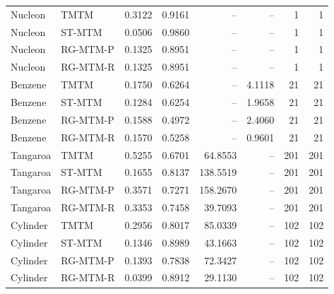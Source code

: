 \begin{longtable}{llrrrrrr}
Nucleon & TMTM & 0.3122 & 0.9161 & -- & -- & 1 & 1\\
Nucleon & ST-MTM & 0.0506 & 0.9860 & -- & -- & 1 & 1\\
Nucleon & RG-MTM-P & 0.1325 & 0.8951 & -- & -- & 1 & 1\\
Nucleon & RG-MTM-R & 0.1325 & 0.8951 & -- & -- & 1 & 1\\
Benzene & TMTM & 0.1750 & 0.6264 & -- & 4.1118 & 21 & 21\\
Benzene & ST-MTM & 0.1284 & 0.6254 & -- & 1.9658 & 21 & 21\\
Benzene & RG-MTM-P & 0.1588 & 0.4972 & -- & 2.4060 & 21 & 21\\
Benzene & RG-MTM-R & 0.1570 & 0.5258 & -- & 0.9601 & 21 & 21\\
Tangaroa & TMTM & 0.5255 & 0.6701 & 64.8553 & -- & 201 & 201\\
Tangaroa & ST-MTM & 0.1655 & 0.8137 & 138.5519 & -- & 201 & 201\\
Tangaroa & RG-MTM-P & 0.3571 & 0.7271 & 158.2670 & -- & 201 & 201\\
Tangaroa & RG-MTM-R & 0.3353 & 0.7458 & 39.7093 & -- & 201 & 201\\
Cylinder & TMTM & 0.2956 & 0.8017 & 85.0339 & -- & 102 & 102\\
Cylinder & ST-MTM & 0.1346 & 0.8989 & 43.1663 & -- & 102 & 102\\
Cylinder & RG-MTM-P & 0.1393 & 0.7838 & 72.3427 & -- & 102 & 102\\
Cylinder & RG-MTM-R & 0.0399 & 0.8912 & 29.1130 & -- & 102 & 102\\
\end{longtable}\endgroup
